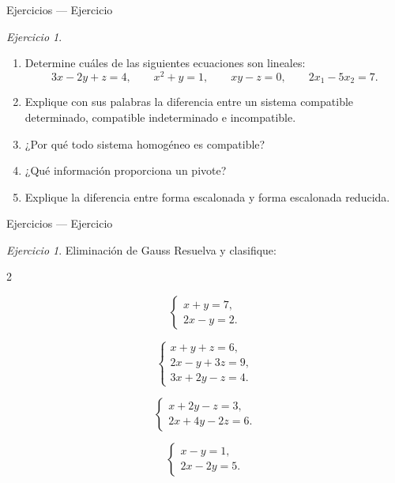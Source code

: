 \documentclass[aspectratio=169,11pt]{beamer}
\theoremstyle{remark}
\newtheorem{Ejer}[definicion]{Ejercicio}
\begin{document}
\begin{frame}[shrink=5]{Ejercicios — Ejercicio}
\footnotesize
\begin{Ejer}
\begin{enumerate}
\item Determine cuáles de las siguientes ecuaciones son lineales:
\[
3x-2y+z=4,\qquad x^2+y=1,\qquad xy-z=0,\qquad 2x_1-5x_2=7.
\]
\item Explique con sus palabras la diferencia entre un sistema compatible determinado, compatible
indeterminado e incompatible.
\item ¿Por qué todo sistema homogéneo es compatible?
\item ¿Qué información proporciona un pivote?
\item Explique la diferencia entre forma escalonada y forma escalonada reducida.
\end{enumerate}
\end{Ejer}
\end{frame}

\begin{frame}[shrink=5]{Ejercicios — Ejercicio}
\footnotesize
\begin{Ejer} Eliminación de Gauss
Resuelva y clasifique:
\begin{enumerate}
\begin{multicols}{2}
\item
\[
\begin{cases}
x+y=7,\\
2x-y=2.
\end{cases}
\]
\item
\[
\begin{cases}
x+y+z=6,\\
2x-y+3z=9,\\
3x+2y-z=4.
\end{cases}
\]
\item
\[
\begin{cases}
x+2y-z=3,\\
2x+4y-2z=6.
\end{cases}
\]
\item
\[
\begin{cases}
x-y=1,\\
2x-2y=5.
\end{cases}
\]
\end{multicols}
\end{enumerate}
\end{Ejer}
\end{frame}
\end{document}
